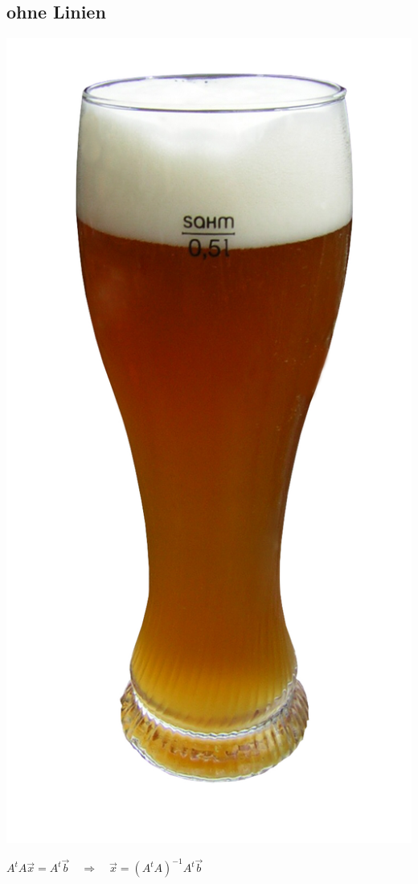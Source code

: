 		\subsection{ohne Linien}
			\begin{minipage}{4.5cm}
				\includegraphics[width=\textwidth]{./images/Weizenbier.jpg}
			\end{minipage} \qquad\qquad				
			\begin{minipage}{0.5\textwidth}
				$\boxed{A^{t} A \vec{x}=A^{t} \vec{b} \quad \Rightarrow \quad \vec{x}=\left(A^{t} A\right)^{-1} A^{t} \vec{b}}$
			\end{minipage}
	
